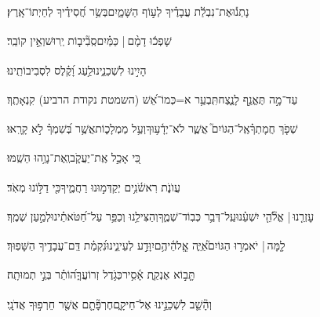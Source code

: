 \documentclass[12pt]{article}
\newcommand{\loc}[1]{\textsuperscript{\locf{#1}}}
\begin{document}
{\loc{ ב}~}‏נָתְנ֡וּ{\hfill}אֶת־נִבְלַ֬ת עֲבָדֶ֗יךָ\newline\hspace*{.5em} לְע֣וֹף הַשָּׁמָ֑יִם{\hfill}בְּשַׂ֥ר חֲ֝סִידֶ֗יךָ לְחַיְתוֹ־אָֽרֶץ׃\par

{\loc{ ג}~}‏שָׁפְכ֬וּ דָמָ֨ם |  כַּמַּ֗יִם{\hfill}סְֽבִ֘יב֤וֹת יְֽרוּשׁ{\hfill}וְאֵ֣ין קוֹבֵֽר׃\par

{\loc{ ד}~}‏הָיִ֣ינוּ  לִשְׁכֵנֵ֑ינוּ{\hfill}לַ֥עַג וָ֝קֶ֗לֶס לִסְבִיבוֹתֵֽינוּ׃\par

{\loc{ ה}~}‏עַד־מָ֣ה  תֶּאֱנַ֣ף לָנֶ֑צַח{\hfill}תִּֽבְעַ֥ר א=כְּמוֹ־אֵ֝שׁ (השמטת נקודת הרביע) קִנְאָתֶֽךָ׃\par

{\loc{ ו}~}‏שְׁפֹ֤ךְ חֲמָתְךָ֗{\hfill}אֶֽל־הַגּוֹיִם֮ אֲשֶׁ֢ר לֹא־יְדָ֫ע֥וּךָ\newline\hspace*{.5em}וְעַ֥ל מַמְלָכ֑וֹת{\hfill}אֲשֶׁ֥ר בְּ֝שִׁמְךָ֗ לֹ֣א קָרָֽאוּ׃\par

{\loc{ ז}~}‏כִּ֭י אָכַ֣ל אֶֽת־יַעֲקֹ֑ב{\hfill}וְֽאֶת־נָוֵ֥הוּ הֵשַֽׁמּוּ׃\par

{\loc{ ח}~}‏{\hfill}עֲוֺנֹ֢ת רִאשֹׁ֫נִ֥ים\newline\hspace*{.5em} יְקַדְּמ֣וּנוּ רַחֲמֶ֑יךָ{\hfill}כִּ֖י דַלּ֣וֹנוּ מְאֹֽד׃\par

{\loc{ ט}~}‏עׇזְרֵ֤נוּ |  אֱלֹ֘הֵ֤י יִשְׁעֵ֗נוּ{\hfill}עַֽל־דְּבַ֥ר כְּבֽוֹד־שְׁמֶ֑ךָ\newline\hspace*{.5em}וְהַצִּילֵ֥נוּ וְכַפֵּ֥ר עַל־חַ֝טֹּאתֵ֗ינוּ{\hfill}לְמַ֣עַן שְׁמֶֽךָ׃\par

{\loc{ י}~}‏לָ֤מָּה |  יֹאמְר֣וּ הַגּוֹיִם֮{\hfill}אַיֵּ֢ה אֱֽלֹהֵ֫יהֶ֥ם\newline\hspace*{.5em}יִוָּדַ֣ע  לְעֵינֵ֑ינוּ{\hfill}נִ֝קְמַ֗ת דַּֽם־עֲבָדֶ֥יךָ הַשָּׁפֽוּךְ׃\par

{\loc{ יא}~}‏תָּ֤ב֣וֹא {\hfill}אֶנְקַ֢ת אָ֫סִ֥יר\newline\hspace*{.5em}כְּגֹ֥דֶל זְרוֹעֲךָ֑{\hfill}ה֝וֹתֵ֗ר בְּנֵ֣י תְמוּתָֽה׃\par

{\loc{ יב}~}‏וְהָ֘שֵׁ֤ב לִשְׁכֵנֵ֣ינוּ  אֶל־חֵיקָ֑ם{\hfill}חֶרְפָּ֘תָ֤ם אֲשֶׁ֖ר חֵרְפ֣וּךָ אֲדֹנָֽי׃\par
\end{document}
